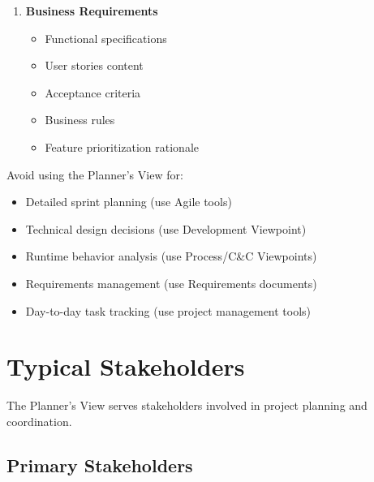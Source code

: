 \documentclass[11pt,letterpaper]{article}
\begin{document}
\begin{enumerate}[label=\textbf{AC\arabic*:}, leftmargin=2.5em]
    \item \textbf{Business Requirements}
    \begin{itemize}[nosep]
        \item Functional specifications
        \item User stories content
        \item Acceptance criteria
        \item Business rules
        \item Feature prioritization rationale
    \end{itemize}
\end{enumerate}

\begin{warningbox}
Avoid using the Planner's View for:

\begin{itemize}[nosep]
    \item Detailed sprint planning (use Agile tools)
    \item Technical design decisions (use Development Viewpoint)
    \item Runtime behavior analysis (use Process/C\&C Viewpoints)
    \item Requirements management (use Requirements documents)
    \item Day-to-day task tracking (use project management tools)
\end{itemize}
\end{warningbox}

\section{Typical Stakeholders}

The Planner's View serves stakeholders involved in project planning and coordination.

\subsection{Primary Stakeholders}
\end{document}
